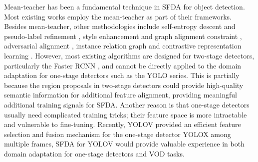 Mean-teacher has been a fundamental technique in SFDA for object detection. Most existing works \cite{vibashan2023instance, li2022source, run_and_chase, chen2023exploiting, liu2023periodically, chu2023adversarial, cao2023contrastive} employ the mean-teacher as part of their frameworks. Besides mean-teacher, other methodologies include self-entropy descent and pseudo-label refinement \cite{li2021free}, style enhancement and graph alignment constraint \cite{li2022source}, adversarial alignment \cite{chu2023adversarial}, instance relation graph \cite{vibashan2023instance} and contrastive representation learning \cite{vibashan2023instance, cao2023contrastive}. However, most existing algorithms are designed for two-stage detectors, particularly the Faster RCNN \cite{faster_rcnn}, and cannot be directly applied to the domain adaptation for one-stage detectors such as the YOLO series. This is partially because the region proposals in two-stage detectors could provide high-quality semantic information for additional feature alignment, providing meaningful additional training signals for SFDA. Another reason is that one-stage detectors usually need complicated training tricks; their feature space is more intractable and vulnerable to fine-tuning. Recently, YOLOV \cite{shi2023yolov} provided an efficient feature selection and fusion mechanism for the one-stage detector YOLOX \cite{ge2021yolox} among multiple frames, SFDA for YOLOV would provide valuable experience in both domain adaptation for one-stage detectors and VOD tasks.
